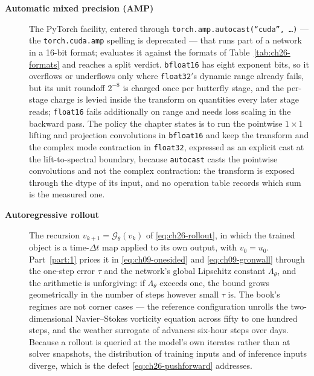 \begin{description}
\item[\textbf{Automatic mixed precision (AMP)}] The PyTorch facility, entered
through \texttt{torch.amp.autocast(``cuda'', \ldots)} --- the
\texttt{torch.cuda.amp} spelling is deprecated --- that runs part of a network in a
16-bit format;  evaluates it
against the formats of Table~\ref{tab:ch26-formats} and reaches a split verdict.
\texttt{bfloat16} has eight exponent bits, so it overflows or underflows only where
\texttt{float32}$'$s dynamic range already fails, but its unit roundoff $2^{-8}$ is
charged once per butterfly stage, and the per-stage charge is levied inside the
transform on quantities every later stage reads; \texttt{float16} fails additionally
on range and needs loss scaling in the backward pass. The policy the chapter states
is to run the pointwise $1 \times 1$ lifting and projection convolutions in
\texttt{bfloat16} and keep the transform and the complex mode contraction in
\texttt{float32}, expressed as an explicit cast at the lift-to-spectral boundary,
because \texttt{autocast} casts the pointwise convolutions and not the complex
contraction: the transform is exposed through the dtype of its input, and no operation
table records which sum is the measured one.

\item[\textbf{Autoregressive rollout}] The recursion $v_{k+1} =
\mathcal{G}_{\theta}(v_k)$ of \eqref{eq:ch26-rollout}, in which the trained object is
a time-$\Delta t$ map applied to its own output, with $v_0 = u_0$. Part~\ref{part:1}
prices it in \eqref{eq:ch09-onesided} and \eqref{eq:ch09-gronwall} through the
one-step error $\tau$ and the network's global Lipschitz constant $\Lambda_\theta$,
and the arithmetic is unforgiving: if $\Lambda_\theta$ exceeds one, the bound grows
geometrically in the number of steps however small $\tau$ is. The book's regimes are
not corner cases --- the reference configuration unrolls the two-dimensional
Navier--Stokes vorticity equation across fifty to one hundred steps, and the weather
surrogate of \cite{pathak2022fourcastnet} advances six-hour steps over days. Because
a rollout is queried at the model's own iterates rather than at solver snapshots,
the distribution of training inputs and of inference inputs diverge, which is the
defect \eqref{eq:ch26-pushforward} addresses. 


\end{description}
